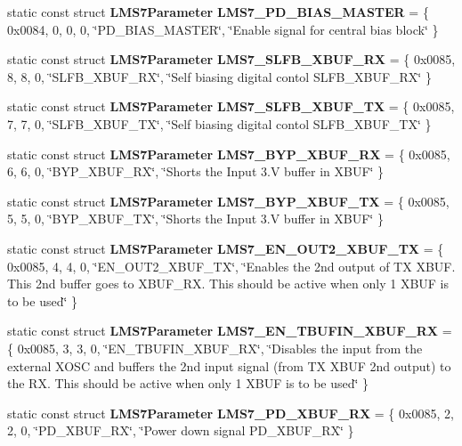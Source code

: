 \begin{DoxyCompactItemize}
\item 
static const struct {\bf L\+M\+S7\+Parameter} {\bf L\+M\+S7\+\_\+\+P\+D\+\_\+\+B\+I\+A\+S\+\_\+\+M\+A\+S\+T\+ER} = \{ 0x0084, 0, 0, 0, \char`\"{}\+P\+D\+\_\+\+B\+I\+A\+S\+\_\+\+M\+A\+S\+T\+E\+R\char`\"{}, \char`\"{}\+Enable signal for central bias block\char`\"{} \}
\item 
static const struct {\bf L\+M\+S7\+Parameter} {\bf L\+M\+S7\+\_\+\+S\+L\+F\+B\+\_\+\+X\+B\+U\+F\+\_\+\+RX} = \{ 0x0085, 8, 8, 0, \char`\"{}\+S\+L\+F\+B\+\_\+\+X\+B\+U\+F\+\_\+\+R\+X\char`\"{}, \char`\"{}\+Self biasing digital contol S\+L\+F\+B\+\_\+\+X\+B\+U\+F\+\_\+\+R\+X\char`\"{} \}
\item 
static const struct {\bf L\+M\+S7\+Parameter} {\bf L\+M\+S7\+\_\+\+S\+L\+F\+B\+\_\+\+X\+B\+U\+F\+\_\+\+TX} = \{ 0x0085, 7, 7, 0, \char`\"{}\+S\+L\+F\+B\+\_\+\+X\+B\+U\+F\+\_\+\+T\+X\char`\"{}, \char`\"{}\+Self biasing digital contol S\+L\+F\+B\+\_\+\+X\+B\+U\+F\+\_\+\+T\+X\char`\"{} \}
\item 
static const struct {\bf L\+M\+S7\+Parameter} {\bf L\+M\+S7\+\_\+\+B\+Y\+P\+\_\+\+X\+B\+U\+F\+\_\+\+RX} = \{ 0x0085, 6, 6, 0, \char`\"{}\+B\+Y\+P\+\_\+\+X\+B\+U\+F\+\_\+\+R\+X\char`\"{}, \char`\"{}\+Shorts the Input 3.\+V buffer in X\+B\+U\+F\char`\"{} \}
\item 
static const struct {\bf L\+M\+S7\+Parameter} {\bf L\+M\+S7\+\_\+\+B\+Y\+P\+\_\+\+X\+B\+U\+F\+\_\+\+TX} = \{ 0x0085, 5, 5, 0, \char`\"{}\+B\+Y\+P\+\_\+\+X\+B\+U\+F\+\_\+\+T\+X\char`\"{}, \char`\"{}\+Shorts the Input 3.\+V buffer in X\+B\+U\+F\char`\"{} \}
\item 
static const struct {\bf L\+M\+S7\+Parameter} {\bf L\+M\+S7\+\_\+\+E\+N\+\_\+\+O\+U\+T2\+\_\+\+X\+B\+U\+F\+\_\+\+TX} = \{ 0x0085, 4, 4, 0, \char`\"{}\+E\+N\+\_\+\+O\+U\+T2\+\_\+\+X\+B\+U\+F\+\_\+\+T\+X\char`\"{}, \char`\"{}\+Enables the 2nd output of T\+X X\+B\+U\+F. This 2nd buffer goes to X\+B\+U\+F\+\_\+\+R\+X. This should be active when only 1 X\+B\+U\+F is to be used\char`\"{} \}
\item 
static const struct {\bf L\+M\+S7\+Parameter} {\bf L\+M\+S7\+\_\+\+E\+N\+\_\+\+T\+B\+U\+F\+I\+N\+\_\+\+X\+B\+U\+F\+\_\+\+RX} = \{ 0x0085, 3, 3, 0, \char`\"{}\+E\+N\+\_\+\+T\+B\+U\+F\+I\+N\+\_\+\+X\+B\+U\+F\+\_\+\+R\+X\char`\"{}, \char`\"{}\+Disables the input from the external X\+O\+S\+C and buffers the 2nd input signal (from T\+X X\+B\+U\+F 2nd output) to the R\+X. This should be active when only 1 X\+B\+U\+F is to be used\char`\"{} \}
\item 
static const struct {\bf L\+M\+S7\+Parameter} {\bf L\+M\+S7\+\_\+\+P\+D\+\_\+\+X\+B\+U\+F\+\_\+\+RX} = \{ 0x0085, 2, 2, 0, \char`\"{}\+P\+D\+\_\+\+X\+B\+U\+F\+\_\+\+R\+X\char`\"{}, \char`\"{}\+Power down signal P\+D\+\_\+\+X\+B\+U\+F\+\_\+\+R\+X\char`\"{} \}

\end{DoxyCompactItemize}
